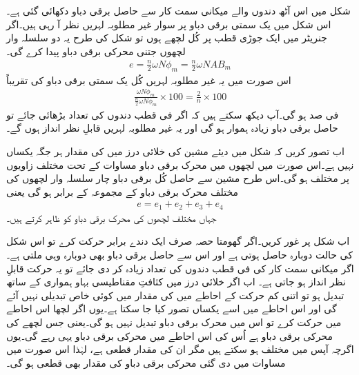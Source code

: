 شکل   میں اس آٹھ دندوں والے میکانی سمت کار سے حاصل برقی دباو دکھائی گئی ہے۔اس شکل میں یک سمتی برقی دباو پر سوار غیر مطلوبہ  لہریں نظر آ رہی ہیں۔اگر جنریٹر میں ایک جوڑی قطب پر کُل  لچھے ہوں تو شکل   کی طرح یہ دو   سلسلہ وار لچھوں جتنی محرکی برقی دباو پیدا کرے گی۔
\begin{align}\label{مساوات_یکسمتی_پیدا_دباو_الف}
e=\frac{n}{2} \omega N \phi_m=\frac{n}{2} \omega N A B_m
\end{align}
اس صورت میں یہ غیر مطلوبہ لہریں کُل یک سمتی برقی دباو کی تقریباً
\begin{align}\label{مساوات_یکسمتی_فی_صد_لہر}
\frac{\omega N \phi_m}{\frac{n}{2} \omega N \phi_m} \times 100=\frac{2}{n} \times 100
\end{align}
فی صد ہو گی۔آپ دیکھ سکتے ہیں کہ اگر فی قطب دندوں کی تعداد بڑھائی جائے تو حاصل برقی دباو زیادہ ہموار ہو گی اور یہ غیر مطلوبہ لہریں قابلِ نظر انداز ہوں گے۔

اب تصور کریں کہ شکل   میں دیئے مشین کی خلائی درز میں  کی مقدار ہر جگہ یکساں نہیں ہے۔اس صورت میں لچھوں میں محرک برقی دباو مساوات   کے تحت مختلف زاویوں پر مختلف ہو گی۔اس طرح مشین سے حاصل کُل برقی دباو چار سلسلہ وار لچھوں کی مختلف محرک برقی دباو کے مجموعہ کے برابر ہو گی یعنی
\begin{align} \label{مساوات_یکسمتی_کل_دباو_مجموعہ}
e=e_1+e_2+e_3+e_4
\end{align}
جہاں   مختلف لچھوں کی محرک برقی دباو کو ظاہر کرتے ہیں۔

اب شکل   پر غور کریں۔اگر گھومتا حصہ صرف ایک دندے برابر حرکت کرے تو اس شکل کی حالت  دوبارہ حاصل ہوتی ہے اور اس سے حاصل برقی دباو بھی دوبارہ وہی ملتی ہے۔اگر میکانی سمت کار کی فی قطب دندوں کی تعداد زیادہ کر دی جائے تو یہ حرکت قابلِ نظر انداز ہو جاتی ہے۔ اب اگر خلائی درز میں کثافتِ مقناطیسی بہاو ہمواری کے ساتھ تبدیل ہو تو اتنی کم حرکت کے احاطے میں  کی مقدار میں کوئی خاص تبدیلی نہیں آئے گی اور اس احاطے میں اسے یکساں تصور کیا جا سکتا ہے۔یوں اگر لچھا اس احاطے میں حرکت کرے تو اس میں محرک برقی دباو تبدیل نہیں ہو گی۔یعنی جس لچھے کی محرکی برقی دباو  ہے اُس کی اس احاطے میں محرکی برقی دباو یہی رہے گی۔یوں اگرچہ  آپس میں مختلف ہو سکتے ہیں مگر ان کی مقدار قطعی ہے، لہٰذا اس صورت میں مساوات   میں دی گئی محرکی برقی دباو کی مقدار بھی قطعی ہو گی۔ 

